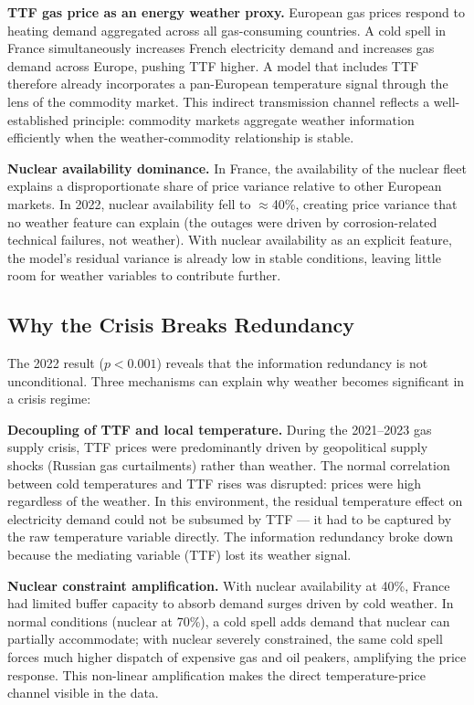 \textbf{TTF gas price as an energy weather proxy.} European gas prices respond
to heating demand aggregated across all gas-consuming countries. A cold spell
in France simultaneously increases French electricity demand and increases gas
demand across Europe, pushing TTF higher. A model that includes TTF therefore
already incorporates a pan-European temperature signal through the lens of the
commodity market. This indirect transmission channel reflects a well-established principle: commodity
markets aggregate weather information efficiently when the weather-commodity
relationship is stable.

\textbf{Nuclear availability dominance.} In France, the availability of the
nuclear fleet explains a disproportionate share of price variance relative to
other European markets. In 2022, nuclear availability fell to $\approx$40\%,
creating price variance that no weather feature can explain (the outages were
driven by corrosion-related technical failures, not weather). With nuclear
availability as an explicit feature, the model's residual variance is already
low in stable conditions, leaving little room for weather variables to
contribute further.

\subsection{Why the Crisis Breaks Redundancy}

The 2022 result ($p < 0.001$) reveals that the information redundancy is
not unconditional. Three mechanisms can explain why weather becomes significant
in a crisis regime:

\textbf{Decoupling of TTF and local temperature.} During the 2021--2023 gas
supply crisis, TTF prices were predominantly driven by geopolitical supply
shocks (Russian gas curtailments) rather than weather. The normal correlation
between cold temperatures and TTF rises was disrupted: prices were high
regardless of the weather. In this environment, the residual temperature effect
on electricity demand could not be subsumed by TTF — it had to be captured
by the raw temperature variable directly. The information redundancy broke down
because the mediating variable (TTF) lost its weather signal.

\textbf{Nuclear constraint amplification.} With nuclear availability at 40\%,
France had limited buffer capacity to absorb demand surges driven by cold
weather. In normal conditions (nuclear at 70\%), a cold spell adds demand that
nuclear can partially accommodate; with nuclear severely constrained, the same
cold spell forces much higher dispatch of expensive gas and oil peakers,
amplifying the price response. This non-linear amplification makes the direct
temperature-price channel visible in the data.

